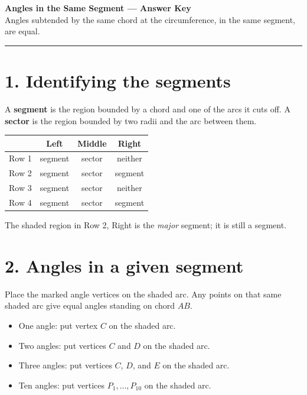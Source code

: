 \documentclass[11pt,a4paper]{article}
\begin{document}
\begin{center}
  {\LARGE \bfseries Angles in the Same Segment --- Answer Key}\\[0.25em]
  \small Angles subtended by the same chord at the circumference, in the same segment, are equal.
\end{center}

\hrule
\vspace{1em}

\section*{1. Identifying the segments}

A \textbf{segment} is the region bounded by a chord and one of the arcs it cuts off.  
A \textbf{sector} is the region bounded by two radii and the arc between them.

\begin{center}
\begin{tabular}{c|c|c|c}
 & Left & Middle & Right \\ \hline
Row 1 & segment & sector & neither \\
Row 2 & segment & sector & segment \\
Row 3 & segment & sector & neither \\
Row 4 & segment & sector & segment
\end{tabular}
\end{center}

The shaded region in Row 2, Right is the \emph{major} segment; it is still a segment.

\section*{2. Angles in a given segment}

Place the marked angle vertices on the shaded arc. Any points on that same shaded arc give equal angles standing on chord \(AB\).

\begin{itemize}
  \item[(a)] One angle: put vertex \(C\) on the shaded arc.
  \item[(b)] Two angles: put vertices \(C\) and \(D\) on the shaded arc.
  \item[(c)] Three angles: put vertices \(C\), \(D\), and \(E\) on the shaded arc.
  \item[(d)] Ten angles: put vertices \(P_1,\dots,P_{10}\) on the shaded arc.
\end{itemize}
\end{document}
